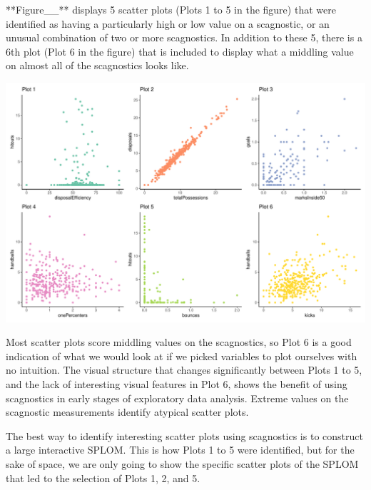 **Figure\_\_** displays 5 scatter plots (Plots 1 to 5 in the figure)
that were identified as having a particularly high or low value on a
scagnostic, or an unusual combination of two or more scagnostics. In
addition to these 5, there is a 6th plot (Plot 6 in the figure) that is
included to display what a middling value on almost all of the
scagnostics looks like.

\begin{Schunk}


\begin{center}\includegraphics[width=0.8\linewidth]{mason-lee-laa-cook_files/figure-latex/AFLW-scatters-static-1} \end{center}

\end{Schunk}

Most scatter plots score middling values on the scagnostics, so Plot 6
is a good indication of what we would look at if we picked variables to
plot ourselves with no intuition. The visual structure that changes
significantly between Plots 1 to 5, and the lack of interesting visual
features in Plot 6, shows the benefit of using scagnostics in early
stages of exploratory data analysis. Extreme values on the scagnostic
measurements identify atypical scatter plots.

The best way to identify interesting scatter plots using scagnostics is
to construct a large interactive SPLOM. This is how Plots 1 to 5 were
identified, but for the sake of space, we are only going to show the
specific scatter plots of the SPLOM that led to the selection of Plots
1, 2, and 5.

